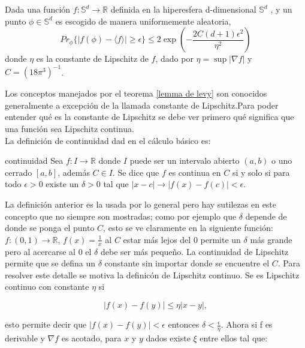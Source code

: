 \begin{lemma} \label{lemma de levy}

Dada una función $f: \mathbb{S}^d \to \mathbb{R} $ definida en la hiperesfera d-dimensional $\mathbb{S}^d$ , y un punto $\phi \in \mathbb{S}^d $ es escogido de manera uniformemente aleatoria,
\begin{equation}
Pr_{\phi} \{ |f(\phi)- \langle f \rangle| \geq \epsilon \} \leq 2 \exp(-\frac{2C(d+1)\epsilon^2}{\eta^2})
\end{equation}
donde $\eta$ es la constante de Lipschitz de $f$, dado por $\eta= \sup|\nabla f|$ y $C=(18 \pi^3)^{-1} $.\\

\end{lemma}

Los conceptos manejados por el teorema \ref{lemma de levy} son conocidos generalmente a excepción de la llamada constante de Lipschitz.Para poder entender qué es la  constante de Lipschitz se debe ver primero qué significa que una función sea Lipschitz continua. 
\\
La definición de continuidad dad en el cálculo básico es:

\theoremstyle{definition}
\begin{definition}{continuidad}
Sea $f: I \to \mathbb{R}$ donde $I$ puede ser un intervalo abierto $(a,b)$ o uno cerrado $[a,b]$, además $C \in I$. Se dice que $f$ es continua en $C$ si y solo si para todo $ \epsilon >0 $  existe un $ \delta >0 $ tal que  $ |x-c|\longrightarrow |f(x)-f(c)|< \epsilon $.
\end{definition} 

La  definición anterior es la usada por lo general pero hay sutilezas en este concepto que no siempre son mostradas; como por ejemplo que $\delta$ depende de donde se ponga el  punto $C$, esto se ve claramente en la siguiente función: $f: (0,1) \to \mathbb{R}$, $f(x)=\frac{1}{x} $ al $C$ estar más lejos del $0$ permite un $\delta$ más grande pero al acercarse al $0$ el $\delta$ debe ser más pequeño. La continuidad de Lipschitz permite que se defina un $\delta$ constante sin importar donde se encuentre el $C$. Para resolver este detalle se motiva la definicón de Lipschitz continuo. Se es Lipschitz continuo con constante $\eta$ si

\begin{equation}
|f(x) -f(y)| \leq \eta |x-y|,
\end{equation}

esto permite decir que  $|f(x)-f(y)| < \epsilon $ entonces $\delta < \frac{\epsilon}{\eta} $. Ahora si f es derivable y $\nabla f$ es acotado, para $x$ y $y$ dados existe $\xi$ entre ellos tal que:


